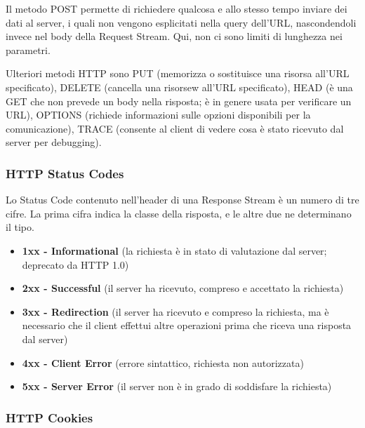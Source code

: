             \vspace{3mm}
            
            Il metodo POST permette  di richiedere qualcosa e allo stesso tempo inviare dei dati al server, i quali non vengono esplicitati nella query dell'URL, nascondendoli invece nel body della Request Stream. Qui, non ci sono limiti di lunghezza nei parametri.
            
            \vspace{3mm}
            
            Ulteriori metodi HTTP sono PUT (memorizza o sostituisce una risorsa all'URL specificato), DELETE (cancella una risorsew all'URL specificato), HEAD (è una GET che non prevede un body nella risposta; è in genere usata per verificare un URL), OPTIONS (richiede informazioni sulle opzioni disponibili per la comunicazione), TRACE (consente al client di vedere cosa è stato ricevuto dal server per debugging).
        
        \subsubsection{HTTP Status Codes}
        
            Lo Status Code contenuto nell'header di una Response Stream è un numero di tre cifre. La prima cifra indica la classe della risposta, e le altre due ne determinano il tipo.
            
            \begin{itemize}
                \item \textbf{1xx - Informational} (la richiesta è in stato di valutazione dal server; deprecato da HTTP 1.0)
                \item \textbf{2xx - Successful} (il server ha ricevuto, compreso e accettato la richiesta)
                \item \textbf{3xx - Redirection} (il server ha ricevuto e compreso la richiesta, ma è necessario che il client effettui altre operazioni prima che riceva una risposta dal server)
                \item \textbf{4xx - Client Error} (errore sintattico, richiesta non autorizzata)
                \item \textbf{5xx - Server Error} (il server non è in grado di soddisfare la richiesta)
            \end{itemize}
        
        \subsubsection{HTTP Cookies}
        
